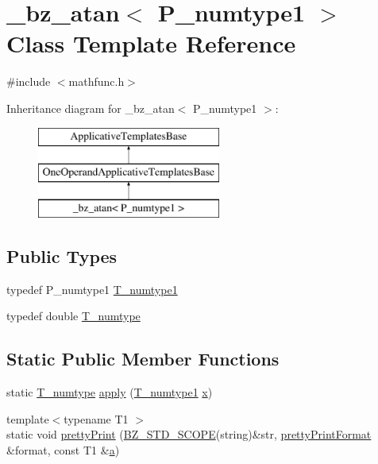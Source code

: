 \hypertarget{class__bz__atan}{}\section{\+\_\+bz\+\_\+atan$<$ P\+\_\+numtype1 $>$ Class Template Reference}
\label{class__bz__atan}


{\ttfamily \#include $<$mathfunc.\+h$>$}

Inheritance diagram for \+\_\+bz\+\_\+atan$<$ P\+\_\+numtype1 $>$\+:\begin{figure}[H]
\begin{center}
\leavevmode
\includegraphics[height=3.000000cm]{class__bz__atan}
\end{center}
\end{figure}
\subsection*{Public Types}
\begin{DoxyCompactItemize}
\item 
typedef P\+\_\+numtype1 \hyperlink{class__bz__atan_af2fc4ebdc7265d834cbe9de55a9044ce}{T\+\_\+numtype1}
\item 
typedef double \hyperlink{class__bz__atan_a2911cf20bce989be4e4af28a94f06d3b}{T\+\_\+numtype}
\end{DoxyCompactItemize}
\subsection*{Static Public Member Functions}
\begin{DoxyCompactItemize}
\item 
static \hyperlink{class__bz__atan_a2911cf20bce989be4e4af28a94f06d3b}{T\+\_\+numtype} \hyperlink{class__bz__atan_a8505f851e00fc19c7e42392e902d8b8d}{apply} (\hyperlink{class__bz__atan_af2fc4ebdc7265d834cbe9de55a9044ce}{T\+\_\+numtype1} \hyperlink{vecnorm1_8cc_ac73eed9e41ec09d58f112f06c2d6cb63}{x})
\item 
{\footnotesize template$<$typename T1 $>$ }\\static void \hyperlink{class__bz__atan_a52e7ed2ef18689f131bcec8aa8080664}{pretty\+Print} (\hyperlink{numinquire_8h_a2b24ffc3b4ef9803956bc7715c6c7b83}{B\+Z\+\_\+\+S\+T\+D\+\_\+\+S\+C\+O\+P\+E}(string)\&str, \hyperlink{classprettyPrintFormat}{pretty\+Print\+Format} \&format, const T1 \&\hyperlink{gen__mat5files_8m_aae328bf20413f220e38aec4d95bfd6da}{a})
\end{DoxyCompactItemize}


